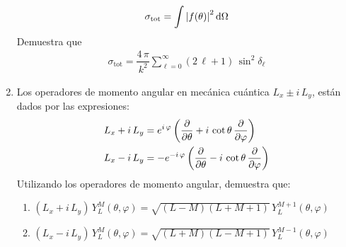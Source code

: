 \begin{enumerate}
\begin{align*}
\sigma_{\text{tot}} = \int \abs{f(\theta)}^{2} \dd{\Omega}
\end{align*}
Demuestra que
\begin{align*}
\sigma_{\text{tot}} = \dfrac{4 \, \pi}{k^{2}} \sum_{\ell=0}^{\infty} (2 \, \ell + 1) \, \sin^{2} \delta_{\ell}
\end{align*}
\item Los operadores de momento angular en mecánica cuántica $L_{x} \pm i \, L_{y}$, están dados por las expresiones:
\begin{align*}
L_{x} + i \, L_{y} &= e^{i \, \varphi} \left( \pdv{\theta} + i \, \cot \theta \, \pdv{\varphi} \right) \\
L_{x} - i \, L_{y} &= -e^{-i \, \varphi} \left( \pdv{\theta} - i \, \cot \theta \, \pdv{\varphi} \right)
\end{align*}
Utilizando los operadores de momento angular, demuestra que:
\begin{enumerate}
\itemsep1em
\item $(L_{x} + i \, L_{y}) \, Y_{L}^{M} (\theta, \varphi) = \sqrt{(L - M)(L + M + 1)} \, Y_{L}^{M+1} (\theta, \varphi)$
\item $(L_{x} - i \, L_{y}) \, Y_{L}^{M} (\theta, \varphi) = \sqrt{(L + M)(L - M + 1)} \, Y_{L}^{M-1} (\theta, \varphi)$
\end{enumerate}
\end{enumerate}
